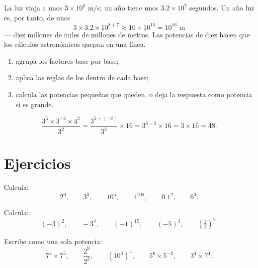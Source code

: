 \begin{example}\label{ex:g8:powers:magnitude}
La luz viaja a unos $3 \times 10^8$ m/s; un año tiene unos
$3.2 \times 10^7$ segundos. Un año luz es, por tanto, de unos
\[
3 \times 3.2 \times 10^{8+7} \approx 10 \times 10^{15} = 10^{16}
\text{ m}
\]
--- diez millones de miles de millones de metros. Las potencias de diez hacen que los cálculos
astronómicos quepan en una línea.
\end{example}

\begin{method}\label{met:g8:powers:simplify}
\begin{enumerate}
  \item agrupa los factores base por base;
  \item aplica las reglas de los  dentro de cada base;
  \item calcula las potencias pequeñas que queden, o deja la respuesta como
        potencia si es grande.
\end{enumerate}
\end{method}

\begin{example}\label{ex:g8:powers:simplify}
\[
\frac{3^5 \times 3^{-2} \times 4^2}{3^2}
= \frac{3^{5 + (-2)}}{3^2} \times 16
= 3^{3 - 2} \times 16
= 3 \times 16 = 48 .
\]
\end{example}

\section{Ejercicios}

\begin{exercise}[$\star$]\label{exo:g8:powers:1}
Calcula:
\[
2^6, \qquad 3^3, \qquad 10^5, \qquad 1^{100}, \qquad 0.1^2, \qquad
6^0 .
\]
\end{exercise}

\begin{exercise}[$\star$]\label{exo:g8:powers:2}
Calcula:
\[
(-3)^2, \qquad -3^2, \qquad (-1)^{15}, \qquad (-5)^3, \qquad
\left(\tfrac{2}{3}\right)^2 .
\]
\end{exercise}

\begin{exercise}[$\star$]\label{exo:g8:powers:3}
Escribe como una sola potencia:
\[
7^4 \times 7^5, \qquad
\frac{2^9}{2^3}, \qquad
\left(10^3\right)^4, \qquad
5^6 \times 5^{-2}, \qquad
3^4 \times 7^4 .
\]
\end{exercise}

